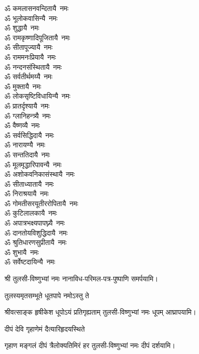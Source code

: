 \begin{multicols}{2}
\begin{flushleft}
ॐ कमलासनवन्दितायै~नमः\\
ॐ भूलोकवासिन्यै~नमः\\
ॐ शुद्धायै~नमः\\
ॐ रामकृष्णादिपूजितायै~नमः\\
ॐ सीतापूज्यायै~नमः\\
ॐ राममनःप्रियायै~नमः\\
ॐ नन्दनसंस्थितायै~नमः\\
ॐ सर्वतीर्थमय्यै~नमः\\
ॐ मुक्तायै~नमः\hfill{}‌\\
ॐ लोकसृष्टिविधायिन्यै~नमः\\
ॐ प्रातर्दृश्यायै~नमः\\
ॐ ग्लानिहन्त्र्यै~नमः\\
ॐ वैष्णव्यै~नमः\\
ॐ सर्वसिद्धिदायै~नमः\\
ॐ नारायण्यै~नमः\\
ॐ सन्ततिदायै~नमः\\
ॐ मूलमृद्धारिपावन्यै~नमः\\
ॐ अशोकवनिकासंस्थायै~नमः\\
ॐ सीताध्यातायै~नमः\hfill{}‌\\
ॐ निराश्रयायै~नमः\\
ॐ गोमतीसरयूतीररोपितायै~नमः\\
ॐ कुटिलालकायै~नमः\\
ॐ अपात्रभक्ष्यपापघ्न्यै~नमः\\
ॐ दानतोयविशुद्धिदायै~नमः\\
ॐ श्रुतिधारणसुप्रीतायै~नमः\\
ॐ शुभायै~नमः\\
ॐ सर्वेष्टदायिन्यै~नमः\hfill{}\\
\end{flushleft}
\end{multicols}
श्री तुलसी-विष्णुभ्यां नमः नानाविध-परिमल-पत्र-पुष्पाणि समर्पयामि।

{तुलस्यमृतसम्भूते धूतपापे नमोऽस्तु ते}

{श्रीवत्साङ्क हृषीकेश धूपोऽयं प्रतिगृह्यताम्}
\hfill{}तुलसी-विष्णुभ्यां नमः धूपम् आघ्रापयामि।

{दीपं देवि गृहाणेमं दैत्यारिहृदयस्थिते}

{गृहाण मङ्गलं दीपं त्रैलोक्यतिमिरं हर}
\hfill{}तुलसी-विष्णुभ्यां नमः दीपं दर्शयामि।

